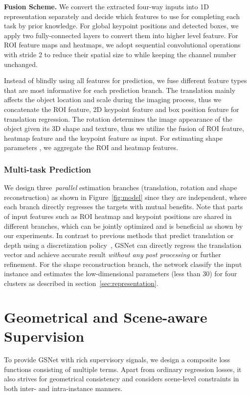 \documentclass[runningheads]{llncs}
\begin{document}
\smallskip\noindent\textbf{Fusion Scheme.}
We convert the extracted four-way inputs into 1D representation separately and decide which features to use for completing each task by prior knowledge. 
For global keypoint positions and detected boxes, we apply two fully-connected layers to convert them into higher level feature. 
For ROI feature maps and heatmaps, we adopt sequential convolutional operations with stride 2 to reduce their spatial size to  while keeping the channel number unchanged.

Instead of blindly using all features for prediction, we fuse different feature types that are most informative for each prediction branch.
The translation  mainly affects the object location and scale during the imaging process, thus we concatenate the ROI feature, 2D keypoint feature and box position feature for translation regression.
The rotation  determines the image appearance of the object given its 3D shape and texture, thus we utilize the fusion of ROI feature, heatmap feature and the keypoint feature as input. For estimating shape parameters , we aggregate the ROI and heatmap features.

\subsubsection{Multi-task Prediction}
\label{sec:output} 
We design three~\textit{parallel} estimation branches (translation, rotation and shape reconstruction) as shown in Figure~\ref{fig:model} since they are independent, where each branch directly regresses the targets with mutual benefits. Note that parts of input features such as ROI heatmap and keypoint positions are shared in different branches, which can be jointly optimized and is beneficial as shown by our experiments. In contrast to previous methods that predict translation or depth using a discretization policy~\cite{fu2018deep}, GSNet can directly regress the translation vector and achieve accurate result \textit{without any post processing} or further refinement. For the shape reconstruction branch, the network classify the input instance and estimates the low-dimensional parameters (less than 30) for four clusters as described in section~\ref{sec:representation}.  
\section{Geometrical and Scene-aware Supervision}
\label{sec:constraint} 
To provide GSNet with rich supervisory signals, we design a composite loss functions consisting of multiple terms. Apart from ordinary regression losses, it also strives for geometrical consistency and considers scene-level constraints in both inter- and intra-instance manners.
\end{document}
